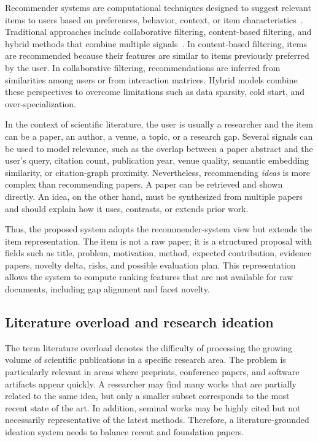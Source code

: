\documentclass[preprint,12pt]{elsarticle}
\begin{document}
Recommender systems are computational techniques designed to suggest relevant items to users based on preferences, behavior, context, or item characteristics~\cite{ricci2015handbook}. Traditional approaches include collaborative filtering, content-based filtering, and hybrid methods that combine multiple signals~\cite{adomavicius2005toward}. In content-based filtering, items are recommended because their features are similar to items previously preferred by the user. In collaborative filtering, recommendations are inferred from similarities among users or from interaction matrices. Hybrid models combine these perspectives to overcome limitations such as data sparsity, cold start, and over-specialization.

In the context of scientific literature, the user is usually a researcher and the item can be a paper, an author, a venue, a topic, or a research gap. Several signals can be used to model relevance, such as the overlap between a paper abstract and the user's query, citation count, publication year, venue quality, semantic embedding similarity, or citation-graph proximity. Nevertheless, recommending \emph{ideas} is more complex than recommending papers. A paper can be retrieved and shown directly. An idea, on the other hand, must be synthesized from multiple papers and should explain how it uses, contrasts, or extends prior work.

Thus, the proposed system adopts the recommender-system view but extends the item representation. The item is not a raw paper; it is a structured proposal with fields such as title, problem, motivation, method, expected contribution, evidence papers, novelty delta, risks, and possible evaluation plan. This representation allows the system to compute ranking features that are not available for raw documents, including gap alignment and facet novelty.

\subsection{Literature overload and research ideation}

The term literature overload denotes the difficulty of processing the growing volume of scientific publications in a specific research area. The problem is particularly relevant in areas where preprints, conference papers, and software artifacts appear quickly. A researcher may find many works that are partially related to the same idea, but only a smaller subset corresponds to the most recent state of the art. In addition, seminal works may be highly cited but not necessarily representative of the latest methods. Therefore, a literature-grounded ideation system needs to balance recent and foundation papers.
\end{document}

